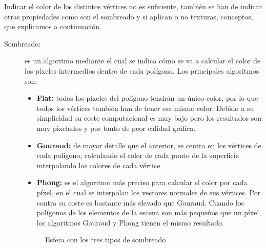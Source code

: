 Indicar el color de los distintos vértices no es suficiente, también se han de indicar otras propiedades como son el sombreado y si aplican o no texturas, conceptos, que explicamos a continuación.

\begin{description} 

\item [Sombreado:] es un algoritmo mediante el cual se indica cómo se va a calcular el color de los píxeles intermedios dentro de cada polígono. Los principales algoritmos son:

\begin{itemize}
\item \textbf{Flat:} todos los píxeles del polígono tendrán un único color, por lo que todos los vértices también han de tener ese mismo color. Debido a su simplicidad su coste computacional es muy bajo pero los resultados son muy pixelados y por tanto de peor calidad gráfica.
\item \textbf{Gouraud:} de mayor detalle que el anterior, se centra en los vértices de cada polígono, calculando el color de cada punto de la superficie interpolando los colores de cada vértice.
\item \textbf{Phong:} es el  algoritmo más preciso para calcular el color por cada píxel, en el cual se interpolan los vectores normales de sus vértices. Por contra su coste es bastante más elevado que Gouraud. Cuando los polígonos de los elementos de la escena son más pequeños que un píxel, los algoritmos Gouraud y Phong tienen el mismo resultado.
\end{itemize}

\begin{figure}[h]
	\centering
	\caption{Esfera con los tres tipos de sombreado}
\end{figure}



\end{description}

